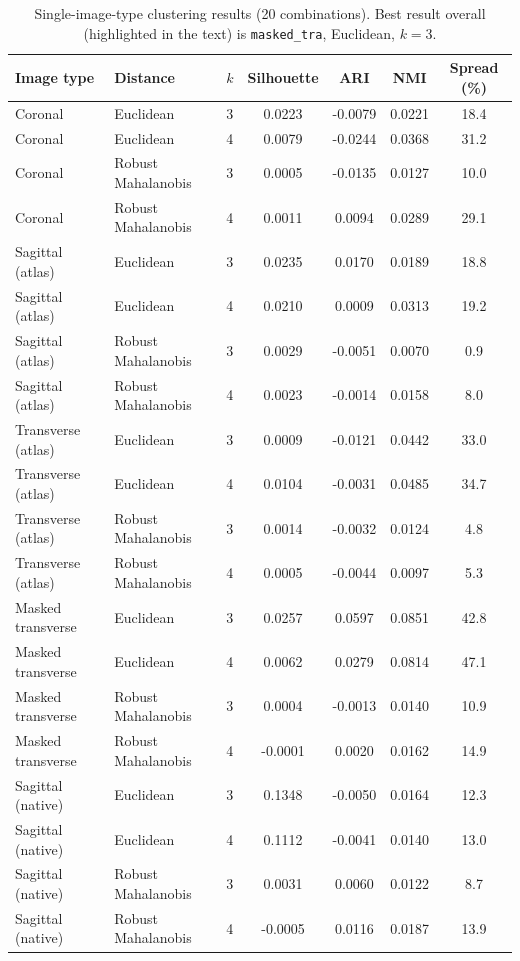 \documentclass[11pt, a4paper]{article}
\begin{document}
\begin{table}[H]
\centering
\footnotesize
\caption{Single-image-type clustering results (20 combinations). Best result overall (highlighted
in the text) is \texttt{masked\_tra}, Euclidean, $k=3$.}
\begin{tabular}{llccccc}
\toprule
\textbf{Image type} & \textbf{Distance} & $k$ & \textbf{Silhouette} & \textbf{ARI} & \textbf{NMI} & \textbf{Spread (\%)} \\
\midrule
Coronal & Euclidean & 3 & 0.0223 & -0.0079 & 0.0221 & 18.4 \\
Coronal & Euclidean & 4 & 0.0079 & -0.0244 & 0.0368 & 31.2 \\
Coronal & Robust Mahalanobis & 3 & 0.0005 & -0.0135 & 0.0127 & 10.0 \\
Coronal & Robust Mahalanobis & 4 & 0.0011 & 0.0094 & 0.0289 & 29.1 \\
Sagittal (atlas) & Euclidean & 3 & 0.0235 & 0.0170 & 0.0189 & 18.8 \\
Sagittal (atlas) & Euclidean & 4 & 0.0210 & 0.0009 & 0.0313 & 19.2 \\
Sagittal (atlas) & Robust Mahalanobis & 3 & 0.0029 & -0.0051 & 0.0070 & 0.9 \\
Sagittal (atlas) & Robust Mahalanobis & 4 & 0.0023 & -0.0014 & 0.0158 & 8.0 \\
Transverse (atlas) & Euclidean & 3 & 0.0009 & -0.0121 & 0.0442 & 33.0 \\
Transverse (atlas) & Euclidean & 4 & 0.0104 & -0.0031 & 0.0485 & 34.7 \\
Transverse (atlas) & Robust Mahalanobis & 3 & 0.0014 & -0.0032 & 0.0124 & 4.8 \\
Transverse (atlas) & Robust Mahalanobis & 4 & 0.0005 & -0.0044 & 0.0097 & 5.3 \\
Masked transverse & Euclidean & 3 & 0.0257 & 0.0597 & 0.0851 & 42.8 \\
Masked transverse & Euclidean & 4 & 0.0062 & 0.0279 & 0.0814 & 47.1 \\
Masked transverse & Robust Mahalanobis & 3 & 0.0004 & -0.0013 & 0.0140 & 10.9 \\
Masked transverse & Robust Mahalanobis & 4 & -0.0001 & 0.0020 & 0.0162 & 14.9 \\
Sagittal (native) & Euclidean & 3 & 0.1348 & -0.0050 & 0.0164 & 12.3 \\
Sagittal (native) & Euclidean & 4 & 0.1112 & -0.0041 & 0.0140 & 13.0 \\
Sagittal (native) & Robust Mahalanobis & 3 & 0.0031 & 0.0060 & 0.0122 & 8.7 \\
Sagittal (native) & Robust Mahalanobis & 4 & -0.0005 & 0.0116 & 0.0187 & 13.9 \\
\bottomrule
\end{tabular}
\end{table}
\end{document}
